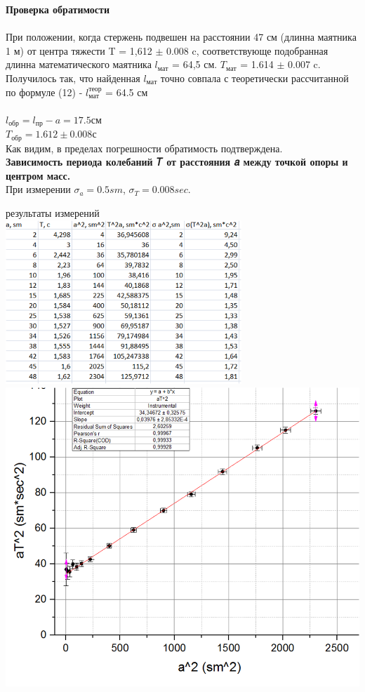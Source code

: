 \documentclass[12pt]{article}
\begin{document}
    \textbf{Проверка обратимости} \\ \\
       При положении, когда стержень подвешен на расстоянии 47 см (длинна маятника 1 м) от центра тяжести T = 1,612 $\pm$ 0.008 c, соответствующе подобранная длинна математического маятника $l_{мат}$ = 64,5 см. $T_{мат}$ = 1.614 $\pm$ 0.007 c. Получилось так, что найденная $l_{мат}$ точно совпала с теоретически рассчитанной по формуле (12) - 
       $l_{мат}^{теор}$ = 64.5 см \\ \\
       
       $l_{обр} = l_{пр} - a = 17.5 см$ \\
       $T_{обр} = 1.612 \pm 0.008 с$ \\
       Как видим, в пределах погрешности обратимость подтверждена. \\
       
    \textbf{Зависимость периода колебаний 𝑇 от расстояния 𝑎 между точкой опоры и центром масс.} \\
     При измерении $\sigma_a = 0.5sm$, $\sigma_T = 0.008sec$. \\
     
     \begin{center} 
     	результаты измерений  \\
     	\includegraphics[width=3.5in]{lab3_table.png}
     	\includegraphics[width=5.5in]{lab3_plot.png}
     \end{center}
     
\end{document}

